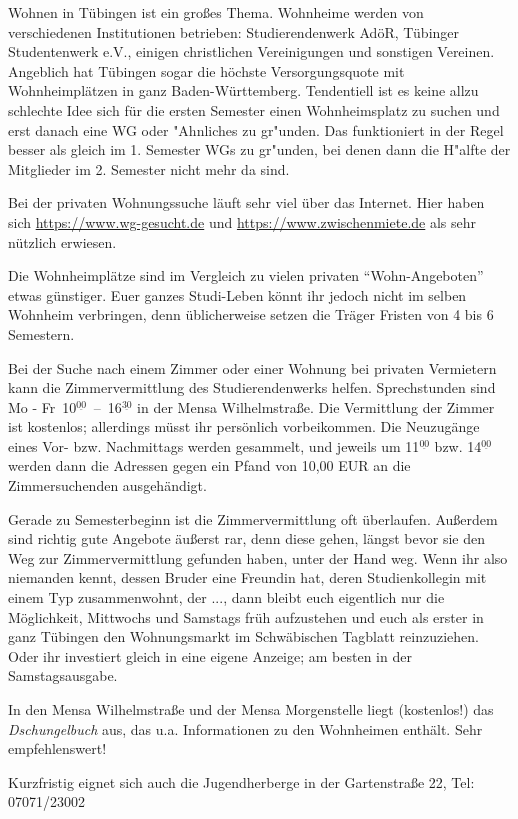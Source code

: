 Wohnen in Tübingen ist ein großes Thema.  Wohnheime werden von
  verschiedenen Institu\-tionen betrieben: Studierendenwerk AdöR,
  Tübinger Studentenwerk e.V., einigen christlichen Vereinigungen und
  sonstigen Vereinen.  Angeblich hat Tübingen sogar die höchste
  Versorgungsquote mit Wohnheimplätzen in ganz Baden-Württemberg.
 Tendentiell ist es keine allzu schlechte Idee sich für die ersten Semester einen Wohnheimsplatz
 zu suchen und erst danach eine WG oder  "Ahnliches zu gr"unden. Das funktioniert
 in der Regel besser als gleich im 1. Semester WGs zu gr"unden, bei denen dann die H"alfte der Mitglieder im
 2. Semester nicht mehr da sind.

Bei der privaten Wohnungssuche läuft sehr viel über das Internet. Hier haben sich \url{https://www.wg-gesucht.de} und \url{https://www.zwischenmiete.de} als sehr nützlich erwiesen.

Die Wohnheimplätze sind im Vergleich zu vielen privaten
  "`Wohn-Angeboten"' etwas günstiger.  Euer ganzes Studi-Leben könnt
  ihr jedoch nicht im selben Wohnheim verbringen, denn üblicherweise
  setzen die Träger Fristen von 4 bis 6 Semestern.

Bei der Suche nach einem Zimmer oder einer Wohnung bei privaten
  Vermietern kann die Zimmervermittlung des Studierendenwerks helfen.
  Sprechstunden sind Mo - Fr~10$^{\underline{00}}$~--~16$^{\underline{30}}$
  in der Mensa Wilhelmstraße.  Die Vermittlung der Zimmer ist kostenlos;
  allerdings müsst ihr persönlich vorbeikommen.
  Die Neuzugänge  eines Vor- bzw. Nachmittags werden gesammelt, und jeweils um
  11$^{\underline{00}}$ bzw. 14$^{\underline{00}}$ werden dann die
  Adressen gegen ein Pfand von 10,00 EUR an die Zimmersuchenden
  ausgehändigt.
  
Gerade zu Semesterbeginn ist die Zimmervermittlung oft überlaufen.
  Außerdem sind richtig gute Angebote äußerst rar, denn diese
  gehen, längst bevor sie den Weg zur Zimmervermittlung gefunden
  haben, unter der Hand weg.  Wenn ihr also niemanden kennt, dessen
  Bruder eine Freundin hat, deren Studienkollegin mit einem Typ
  zusammenwohnt, der ..., dann bleibt euch eigentlich nur die
  Möglichkeit, Mittwochs und Samstags früh aufzustehen und euch
  als erster in ganz Tübingen den Wohnungsmarkt im Schwäbischen
  Tagblatt reinzuziehen.  Oder ihr investiert gleich in eine eigene
  Anzeige;  am besten in der Samstagsausgabe.

In den Mensa Wilhelmstraße und der Mensa
  Morgenstelle liegt (kostenlos!) das \emph{Dschungelbuch} aus, das
  u.a. Informationen zu den Wohnheimen enthält. Sehr empfehlenswert!
\enlargethispage{1ex}

Kurzfristig eignet sich auch die Jugendherberge in der Gartenstraße 22, Tel: 07071/23002
